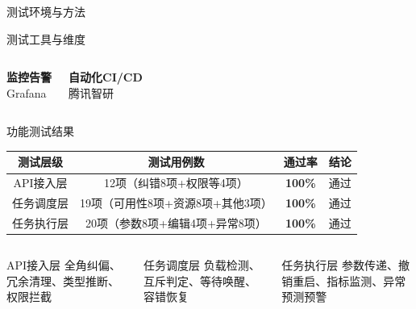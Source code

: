 \documentclass[aspectratio=169,UTF8,xcolor=table]{ctexbeamer}
\begin{document}
\begin{frame}{测试环境与方法}
\begin{block}{测试工具与维度}
\begin{columns}[T]
      \begin{center}
        \textbf{监控告警}\\[2pt]
        \footnotesize Grafana
      \end{center}

      \begin{center}
        \textbf{自动化CI/CD}\\[2pt]
        \footnotesize 腾讯智研
      \end{center}
    \end{columns}
  \end{block}
\end{frame}

\begin{frame}{功能测试结果}
  \begin{center}
    \begin{table}
      \begin{tabular}{|c|c|c|c|}
        \hline
        \rowcolor{ustcblue!30}
        \textbf{测试层级} & \textbf{测试用例数} & \textbf{通过率} & \textbf{结论} \\
        \hline
        API接入层 & 12项（纠错8项+权限等4项） & \textcolor{green!60!black}{\textbf{100\%}} & 通过 \\
        \hline
        任务调度层 & 19项（可用性8项+资源8项+其他3项） & \textcolor{green!60!black}{\textbf{100\%}} & 通过 \\
        \hline
        任务执行层 & 20项（参数8项+编辑4项+异常8项） & \textcolor{green!60!black}{\textbf{100\%}} & 通过 \\
        \hline
      \end{tabular}
    \end{table}
  \end{center}

  \vspace{0.2cm}
  \begin{columns}[T]
    \begin{block}{API接入层}
      \footnotesize
      全角纠偏、冗余清理、类型推断、权限拦截
    \end{block}

    \begin{block}{任务调度层}
      \footnotesize
      负载检测、互斥判定、等待唤醒、容错恢复
    \end{block}

    \begin{block}{任务执行层}
      \footnotesize
      参数传递、撤销重启、指标监测、异常预测预警
    \end{block}
  \end{columns}
\end{frame}
\end{document}
